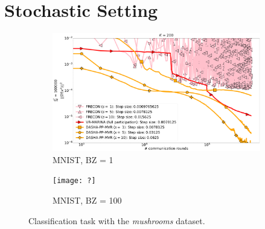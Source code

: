 \documentclass{article}
\begin{document}
\section*{Stochastic Setting}
\begin{figure}[h]
    \begin{subfigure}{.5\textwidth}
        \includegraphics[width=\textwidth]{neurips_2022_stochastic_real-sim_nof_200_numnodes_10_probs_mega_batch_100000_fix_nm_bug.pdf}
        \caption{MNIST, BZ = 1}
    \end{subfigure}
    \begin{subfigure}{.5\textwidth}
        \texttt{[image: ?]}
        \caption{MNIST, BZ = 100}
    \end{subfigure}
\caption{Classification task with the \textit{mushrooms} dataset.}
\label{fig:finite-sum-mnist}
\end{figure}
\end{document}
